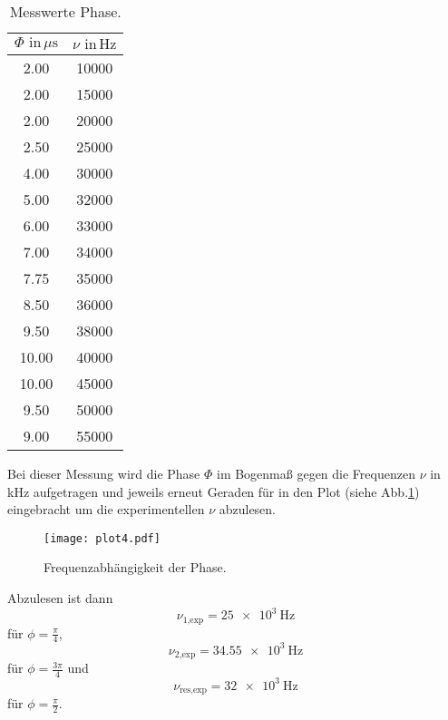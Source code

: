 \begin{table}[h]
  \centering
  \label{tab:Uc2}
  \begin{tabular}{ c c }
    \toprule
    {$\Phi \,\, \text{in} \,\si{\mu\second}$}
   &{$\nu \,\, \text{in} \,\si{\hertz}$} \\

    \midrule
    2.00    & 10000 \\
    2.00    & 15000 \\
    2.00    & 20000 \\
    2.50    & 25000 \\
    4.00    & 30000 \\
    5.00    & 32000 \\
    6.00    & 33000 \\
    7.00    & 34000 \\
    7.75    & 35000 \\
    8.50    & 36000 \\
    9.50    & 38000 \\
    10.00   & 40000 \\
    10.00   & 45000 \\
    9.50    & 50000 \\
    9.00    & 55000 \\


    \bottomrule
  \end{tabular}
  \caption{Messwerte Phase.}
\end{table}

Bei dieser Messung wird die Phase $\Phi$ im Bogenmaß gegen die Frequenzen $\nu$ in kHz aufgetragen
und jeweils erneut Geraden für in den Plot (siehe Abb.\ref{fig:plot4}) eingebracht um die
experimentellen $\nu$ abzulesen.
\begin{figure}[H]
  \centering
  \texttt{[image: plot4.pdf]}
  \caption{Frequenzabhängigkeit der Phase.}
  \label{fig:plot4}
\end{figure}
Abzulesen ist dann
\begin{equation*}
  \nu_{\text{1,exp}} = \SI{25e3}{\hertz}
\end{equation*}
für $\phi = \frac{\pi}{4}$,
\begin{equation*}
  \nu_{\text{2,exp}} = \SI{34.55e3}{\hertz}
\end{equation*}
für $\phi = \frac{3\pi}{4}$ und
\begin{equation*}
  \nu_{\text{res,exp}} = \SI{32e3}{\hertz}
\end{equation*}
für $\phi = \frac{\pi}{2}$.

